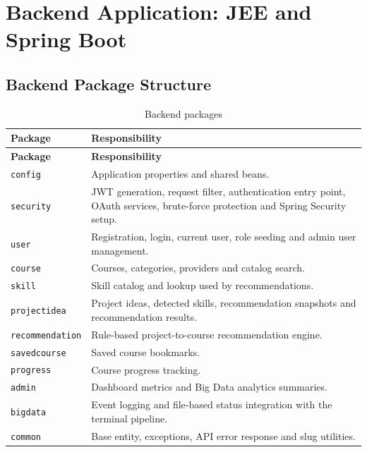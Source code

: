 \documentclass[12pt,a4paper]{report}
\begin{document}
\chapter{Backend Application: JEE and Spring Boot}

\section{Backend Package Structure}
\begin{longtable}{p{}p{}}
\caption{Backend packages}\\
\toprule
\textbf{Package} & \textbf{Responsibility}\\
\midrule
\endfirsthead
\toprule
\textbf{Package} & \textbf{Responsibility}\\
\midrule
\endhead
\texttt{config} & Application properties and shared beans.\\
\texttt{security} & JWT generation, request filter, authentication entry point, OAuth services, brute-force protection and Spring Security setup.\\
\texttt{user} & Registration, login, current user, role seeding and admin user management.\\
\texttt{course} & Courses, categories, providers and catalog search.\\
\texttt{skill} & Skill catalog and lookup used by recommendations.\\
\texttt{projectidea} & Project ideas, detected skills, recommendation snapshots and recommendation results.\\
\texttt{recommendation} & Rule-based project-to-course recommendation engine.\\
\texttt{savedcourse} & Saved course bookmarks.\\
\texttt{progress} & Course progress tracking.\\
\texttt{admin} & Dashboard metrics and Big Data analytics summaries.\\
\texttt{bigdata} & Event logging and file-based status integration with the terminal pipeline.\\
\texttt{common} & Base entity, exceptions, API error response and slug utilities.\\
\bottomrule
\end{longtable}
\end{document}
